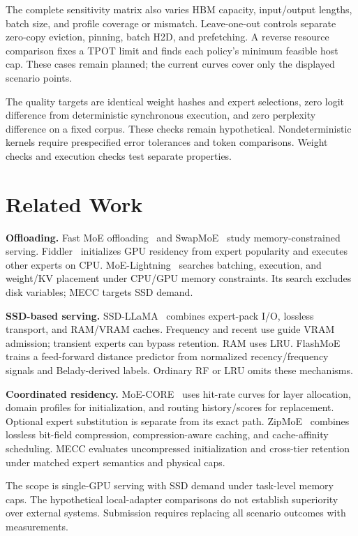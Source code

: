 \documentclass[conference,9pt,letterpaper]{IEEEtran}
\newcommand{\mecc}{\textsc{MECC}}
\begin{document}
The complete sensitivity matrix also varies HBM capacity, input/output lengths, batch size, and profile coverage or mismatch. Leave-one-out controls separate zero-copy eviction, pinning, batch H2D, and prefetching. A reverse resource comparison fixes a TPOT limit and finds each policy's minimum feasible host cap. These cases remain planned; the current curves cover only the displayed scenario points.

The quality targets are identical weight hashes and expert selections, zero logit difference from deterministic synchronous execution, and zero perplexity difference on a fixed corpus. These checks remain hypothetical. Nondeterministic kernels require prespecified error tolerances and token comparisons. Weight checks and execution checks test separate properties.

\section{Related Work}
\textbf{Offloading.} Fast MoE offloading~\cite{offloading} and SwapMoE~\cite{swapmoe} study memory-constrained serving. Fiddler~\cite{fiddler} initializes GPU residency from expert popularity and executes other experts on CPU. MoE-Lightning~\cite{lightning} searches batching, execution, and weight/KV placement under CPU/GPU memory constraints. Its search excludes disk variables; \mecc{} targets SSD demand.

\textbf{SSD-based serving.} SSD-LLaMA~\cite{ssdllama} combines expert-pack I/O, lossless transport, and RAM/VRAM caches. Frequency and recent use guide VRAM admission; transient experts can bypass retention. RAM uses LRU. FlashMoE~\cite{flashmoe} trains a feed-forward distance predictor from normalized recency/frequency signals and Belady-derived labels. Ordinary RF or LRU omits these mechanisms.

\textbf{Coordinated residency.} MoE-CORE~\cite{core} uses hit-rate curves for layer allocation, domain profiles for initialization, and routing history/scores for replacement. Optional expert substitution is separate from its exact path. ZipMoE~\cite{zipmoe} combines lossless bit-field compression, compression-aware caching, and cache-affinity scheduling. \mecc{} evaluates uncompressed initialization and cross-tier retention under matched expert semantics and physical caps.

The scope is single-GPU serving with SSD demand under task-level memory caps. The hypothetical local-adapter comparisons do not establish superiority over external systems. Submission requires replacing all scenario outcomes with measurements.
\end{document}
